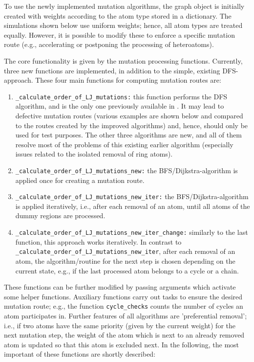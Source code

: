 To use the newly implemented mutation algorithms, the graph object
is initially created with weights according to the atom type stored in a dictionary. The simulations shown
below use uniform weights; hence, all atom types are treated equally. However, it is possible to modify these to
enforce a specific mutation route (e.g., accelerating or postponing
the processing of heteroatoms). 

The core functionality is given by the mutation processing functions.
Currently, three new functions are implemented, in addition to
the simple, existing DFS-approach.
These four main functions for computing mutation routes are:

\begin{enumerate}
\item \texttt{\_calculate\_order\_of\_LJ\_mutations:} this function performs the DFS algorithm, and is the only one previously available in {\trafo}. It may lead to  defective mutation routes (various examples are shown below and compared to the routes created by the improved algorithms) and, hence,
should only be used for test purposes. The other three algorithms
are new, and all of them resolve most of the problems of this existing earlier
algorithm (especially issues related to the isolated removal of ring atoms).


\item \texttt{\_calculate\_order\_of\_LJ\_mutations\_new:} the BFS/Dijkstra-algorithm is
applied once for creating a mutation route.

\item \texttt{\_calculate\_order\_of\_LJ\_mutations\_new\_iter:} the BFS/Dijkstra-algorithm is
applied iteratively, i.e., after each removal of an atom, until all atoms of the dummy regions are processed.

\item \texttt{\_calculate\_order\_of\_LJ\_mutations\_new\_iter\_change:}
similarly to the last function, this approach works iteratively. In contrast to \texttt{\_calculate\_order\_of\_LJ\_mutations\_new\_iter}, after each removal of an atom, the algorithm/routine for the next step is chosen depending on the current state, e.g., if the last processed atom belongs to a cycle or a chain.
\end{enumerate}

These functions
can be further modified by passing arguments which activate some helper
functions.  Auxiliary functions carry out tasks to ensure the
desired mutation route; e.g., the function \texttt{cycle\_checks} counts the number of cycles an atom participates
in. Further features of all algorithms are 'preferential removal';
i.e., if two atoms have the same priority (given by the current
weight) for the next mutation step, the weight of the atom which is
next to an already removed atom is updated so that this atom is excluded
next. 
In the following, the most important of these functions are shortly described:


